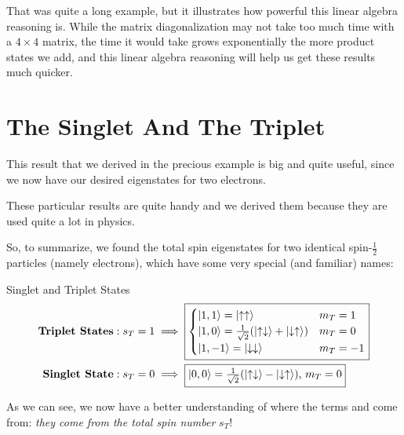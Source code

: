                 That was quite a long example, but it illustrates how powerful this  linear algebra reasoning is. While the matrix diagonalization may not take too much time with a $4\times4$ matrix, the time it would take grows exponentially the more product states we add, and this linear algebra reasoning will help us get these results much quicker.
    \section{The Singlet And The Triplet}
        This result that we derived in the precious example is big and quite useful, since we now have our desired eigenstates for two electrons.
        \begin{insight*}{}{}
            These particular results are quite handy and we derived them because they are used quite a lot in physics.
        \end{insight*}
        So, to summarize, we found the total spin eigenstates for two identical spin-$\frac12$ particles (namely electrons), which have some very special (and familiar) names:
        \begin{theorem}{Singlet and Triplet States}{}
            \begin{align*}
                \textbf{Triplet States}: s_T = 1 &\implies \fbox{$\begin{cases}\ket{1,1} = \ket{\uparrow\uparrow} & m_T = 1\\ \ket{1,0} = \frac{1}{\sqrt2}(\ket{\uparrow\downarrow} + \ket{\downarrow\uparrow}) & m_T = 0\\ \ket{1,-1} = \ket{\downarrow\downarrow} & m_T = -1\end{cases}$}\\
                \textbf{Singlet State}: s_T = 0 &\implies \fbox{$\ket{0,0} = \frac{1}{\sqrt2}(\ket{\uparrow\downarrow}-\ket{\downarrow\uparrow})$, $m_T = 0$}
            \end{align*}
        \end{theorem}
        As we can see, we now have a better understanding of where the terms  and  come from: \textit{they come from the total spin number }$s_T$!
